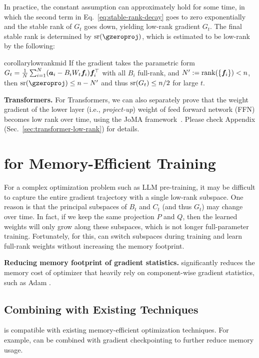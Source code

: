 In practice, the constant assumption can approximately hold for some time, in which the second term in Eq.~\ref{eq:stable-rank-decay} goes to zero exponentially and the stable rank of $G_t$ goes down, yielding low-rank gradient $G_t$. The final stable rank is determined by $\sr(\gzeroproj)$, which is estimated to be low-rank by the following:
\begin{restatable}{corollary}{lowrankmid}
\label{co:low-rank-mid}
If the gradient takes the parametric form $G_t = \frac{1}{N}\sum_{i=1}^N ({\bm{a}}_i - B_i W_t {\bm{f}}_i){\bm{f}}_i^\top$ with all $B_i$ full-rank, and $N' := \operatorname{rank}(\{{\bm{f}}_i\}) < n$, then $\sr(\gzeroproj) \le n - N'$ and thus $\mathrm{sr}(G_t) \le n/2$ for large $t$.
\end{restatable}

\textbf{Transformers.} For Transformers, we can also separately prove that the weight gradient of the lower layer (i.e., \emph{project-up}) weight of feed forward network (FFN) becomes low rank over time, using the JoMA framework~\cite{tian2023joma}. Please check Appendix (Sec.~\ref{sec:transformer-low-rank}) for details.

\section{\lowrank{} for Memory-Efficient Training}
For a complex optimization problem such as LLM pre-training, it may be difficult to capture the entire gradient trajectory with a single low-rank subspace. One reason is that the principal subspaces of $B_t$ and $C_t$ (and thus $G_t$) may change over time. In fact, if we keep the same projection $P$ and $Q$, then the learned weights will only grow along these subspaces, which is not longer full-parameter training. Fortunately, for this, \lowrank{} can switch subspaces during training and learn full-rank weights without increasing the memory footprint.

\textbf{Reducing memory footprint of gradient statistics.} \lowrank{} significantly reduces the memory cost of optimizer that heavily rely on component-wise gradient statistics, such as Adam \citep{kingmaAdamMethodStochastic2014}.

\subsection{Combining with Existing Techniques}

\lowrank{} is compatible with existing memory-efficient optimization techniques. For example, \lowrank{} can be combined with gradient checkpointing \citep{chenTrainingDeepNets2016} to further reduce memory usage.



